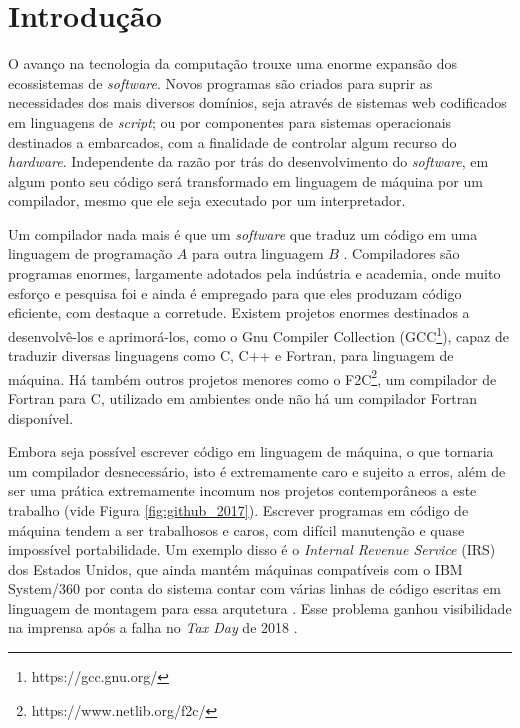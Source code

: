 \chapter{Introdução}
\label{cap:introducao}

O avanço na tecnologia da computação trouxe uma enorme expansão
dos ecossistemas de \textit{software}. Novos programas são criados para
suprir as necessidades dos mais diversos domínios, seja através de sistemas web
codificados em linguagens de \textit{script}; ou por componentes para
sistemas operacionais destinados a embarcados, com a finalidade de controlar algum
recurso do \textit{hardware}. Independente da razão por trás do desenvolvimento
do \textit{software}, em algum ponto seu código será transformado em linguagem
de máquina por um compilador, mesmo que ele seja executado por um
interpretador.

Um compilador nada mais é que um \textit{software} que traduz um código em uma linguagem
de programação $A$ para outra linguagem $B$ \citep{dragonbook}.  Compiladores
são programas enormes, largamente adotados pela indústria e academia, onde muito
esforço e pesquisa foi e ainda é empregado para que eles produzam código
eficiente, com destaque a corretude. Existem projetos enormes destinados a desenvolvê-los e
aprimorá-los, como o Gnu Compiler Collection
(GCC\footnote{https://gcc.gnu.org/}), capaz de traduzir diversas linguagens
como C, C++ e Fortran, para linguagem de máquina. Há também outros projetos
menores como o F2C\footnote{https://www.netlib.org/f2c/}, um compilador de
Fortran para C, utilizado em ambientes onde não há um compilador Fortran
disponível.

Embora seja possível escrever código em linguagem de máquina, o que
tornaria um compilador desnecessário, isto é extremamente caro e
sujeito a erros, além de ser uma prática extremamente
incomum nos projetos contemporâneos a este trabalho \citep{githuboctoverse} (vide
Figura \ref{fig:github_2017}). Escrever programas em código de máquina tendem a
ser trabalhosos e caros, com difícil manutenção e quase impossível portabilidade.
Um exemplo disso é o \textit{Internal Revenue Service} (IRS) dos Estados Unidos,
que ainda mantém máquinas compatíveis com o IBM System/360 por conta do sistema
contar com várias linhas de código escritas em linguagem de montagem para essa
arqutetura \citep{gao}. Esse problema ganhou visibilidade na imprensa após a falha no
\textit{Tax Day} de 2018 \citep{tax_failure}.

